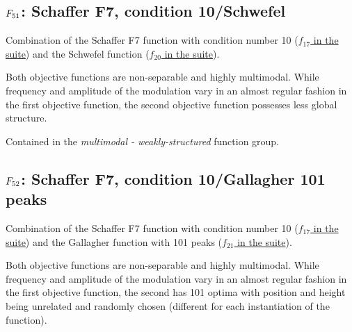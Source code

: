 

\subsection[\texorpdfstring{\protect\(F_{51}\protect\): Schaffer F7, condition 10/Schwefel}{F51: Schaffer F7, condition 10/Schwefel}]{\texorpdfstring{\protect\(F_{51}\protect\): Schaffer F7, condition 10/Schwefel}{}}
\label{index:schaffer-f7-condition-10-schwefel}\label{index:f51}
Combination of the Schaffer F7 function with
condition number 10 (\href{https://coco.gforge.inria.fr/downloads/download16.00/bbobdocfunctions.pdf\#page=85}{\(f_{17}\) in the \bbob suite})
and the Schwefel function (\href{https://coco.gforge.inria.fr/downloads/download16.00/bbobdocfunctions.pdf\#page=100}{\(f_{20}\) in the \bbob suite}).

Both objective functions are non-separable and highly multimodal.
While frequency and amplitude of the modulation vary in an almost
regular fashion in the first objective function, the second objective
function possesses less global structure.

Contained in the \emph{multimodal - weakly-structured} function group.



\subsection[\texorpdfstring{\protect\(F_{52}\protect\): Schaffer F7, condition 10/Gallagher 101 peaks}{F52: Schaffer F7, condition 10/Gallagher 101 peaks}]{\texorpdfstring{\protect\(F_{52}\protect\): Schaffer F7, condition 10/Gallagher 101 peaks}{}}
\label{index:schaffer-f7-condition-10-gallagher-101-peaks}\label{index:f52}
Combination of the Schaffer F7 function with
condition number 10 (\href{https://coco.gforge.inria.fr/downloads/download16.00/bbobdocfunctions.pdf\#page=85}{\(f_{17}\) in the \bbob suite})
and the Gallagher function with
101 peaks (\href{https://coco.gforge.inria.fr/downloads/download16.00/bbobdocfunctions.pdf\#page=105}{\(f_{21}\) in the \bbob suite}).

Both objective functions are non-separable and highly multimodal.
While frequency and amplitude of the modulation vary in an almost
regular fashion in the first objective function, the second has
101 optima with position and height being unrelated and randomly
chosen (different for each instantiation of the function).

